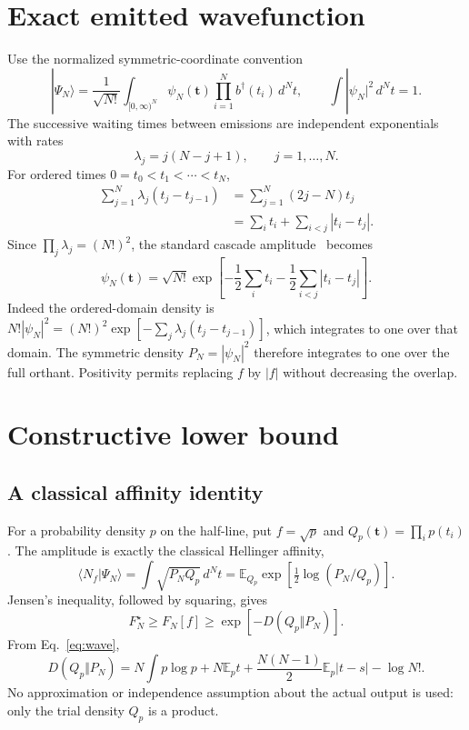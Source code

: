 \documentclass[11pt,a4paper]{article}
\newcommand{\E}{\mathbb E}
\newcommand{\KL}{D}
\begin{document}
\section{Exact emitted wavefunction}
\label{sec:wave}
Use the normalized symmetric-coordinate convention
\begin{equation}
 |\Psi_N\rangle=\frac1{\sqrt{N!}}\int_{[0,\infty)^N}
 \psi_N(\boldsymbol t)\prod_{i=1}^N b^\dagger(t_i)\,d^N t,
 \qquad\int|\psi_N|^2\,d^Nt=1.
\end{equation}
The successive waiting times between emissions are independent exponentials with rates
\begin{equation}\lambda_j=j(N-j+1),\qquad j=1,\ldots,N.\end{equation}
For ordered times $0=t_0<t_1<\cdots<t_N$,
\begin{align}
 \sum_{j=1}^N\lambda_j(t_j-t_{j-1})
 &=\sum_{j=1}^N(2j-N)t_j\\
 &=\sum_i t_i+\sum_{i<j}|t_i-t_j|.
\end{align}
Since $\prod_j\lambda_j=(N!)^2$, the standard cascade amplitude~\cite{perarnau} becomes
\begin{equation}\boxed{
 \psi_N(\boldsymbol t)=\sqrt{N!}\exp\!\left[-\frac12\sum_i t_i-
 \frac12\sum_{i<j}|t_i-t_j|\right].}
\label{eq:wave}
\end{equation}
Indeed the ordered-domain density is $N!|\psi_N|^2=(N!)^2\exp[-\sum_j\lambda_j(t_j-t_{j-1})]$, which integrates to one over that domain. The symmetric density $P_N=|\psi_N|^2$ therefore integrates to one over the full orthant. Positivity permits replacing $f$ by $|f|$ without decreasing the overlap.

\section{Constructive lower bound}
\label{sec:lower}
\subsection{A classical affinity identity}
For a probability density $p$ on the half-line, put $f=\sqrt p$ and $Q_p(\boldsymbol t)=\prod_i p(t_i)$. The amplitude is exactly the classical Hellinger affinity,
\begin{equation}
 \langle N_f|\Psi_N\rangle=\int\sqrt{P_NQ_p}\,d^Nt
 =\E_{Q_p}\exp\!\left[\tfrac12\log(P_N/Q_p)\right].
\end{equation}
Jensen's inequality, followed by squaring, gives
\begin{equation}\boxed{F_N^\star\ge F_N[f]\ge\exp[-\KL(Q_p\Vert P_N)].}\end{equation}
From Eq.~\eqref{eq:wave},
\begin{equation}
 \KL(Q_p\Vert P_N)=N\int p\log p+N\E_p t+
 \frac{N(N-1)}2\E_p|t-s|-\log N!.
\label{eq:kl}
\end{equation}
No approximation or independence assumption about the actual output is used: only the trial density $Q_p$ is a product.
\end{document}
